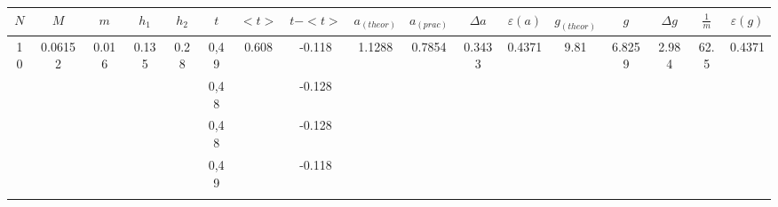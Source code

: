 \documentclass[a4paper,12pt]{article}
\begin{document}
\begin{landscape}
\begin{table}[]
\begin{tabular}{|c|c|c|c|c|c|c|c|c|c|c|c|c|c|c|c|c|}
\hline
$N$                  & $M$                       & $m$                     & $h_1$                   & $h_2$                  & $t$  & $<t>$                   & $t-<t>$ & $a_{(theor)}$            & $a_{(prac)}$             & $\Delta a$               & $\varepsilon(a)$          & $g_{(theor)}$          & $g$                       & $\Delta g$                & $\frac 1m$              & $\varepsilon(g)$          \\ \hline
\multirow{20}{*}{10} & \multirow{20}{*}{0.06152} & \multirow{20}{*}{0.016} & \multirow{10}{*}{0.135} & \multirow{10}{*}{0.28} & 0,49 & \multirow{20}{*}{0.608} & -0.118  & \multirow{20}{*}{1.1288} & \multirow{10}{*}{0.7854} & \multirow{10}{*}{0.3433} & \multirow{10}{*}{0.4371}  & \multirow{20}{*}{9.81} & \multirow{10}{*}{6.8259}  & \multirow{10}{*}{2.984}   & \multirow{20}{*}{62.5} & \multirow{10}{*}{0.4371}  \\ \cline{6-6} \cline{8-8}
                     &                           &                         &                         &                        & 0,48 &                         & -0.128  &                          &                          &                          &                           &                        &                           &                           &                         &                           \\ \cline{6-6} \cline{8-8}
                     &                           &                         &                         &                        & 0,48 &                         & -0.128  &                          &                          &                          &                           &                        &                           &                           &                         &                           \\ \cline{6-6} \cline{8-8}
                     &                           &                         &                         &                        & 0,49 &                         & -0.118  &                          &                          &                          &                           &                        &                           &                           &                         &                           \\ \cline{6-6} \cline{8-8}

\end{tabular}
\end{table}
\end{landscape}
\end{document}
